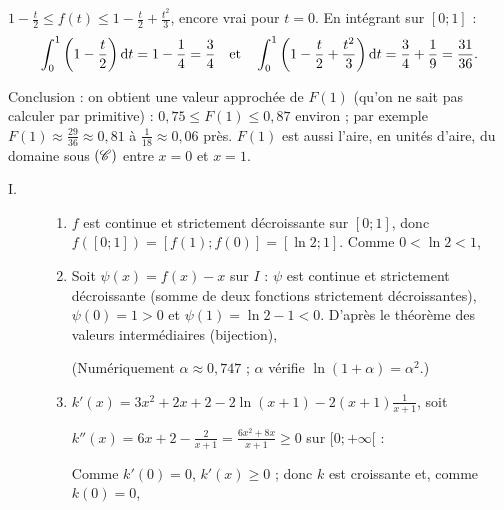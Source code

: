 \begin{description}
\begin{description}
\begin{enumerate}
				$1 - \frac{t}{2} \leq f(t) \leq 1 - \frac{t}{2} + \frac{t^2}{3}$, encore vrai pour $t = 0$.
				En intégrant sur $[0;1]$ :
				\[
					\int_0^1 \left(1 - \frac{t}{2}\right)\mathrm{d}t = 1 - \frac{1}{4} = \frac{3}{4}
					\quad\text{et}\quad
					\int_0^1 \left(1 - \frac{t}{2} + \frac{t^2}{3}\right)\mathrm{d}t = \frac{3}{4} + \frac{1}{9} = \frac{31}{36} .
				\]
				\par\noindent{}
				Conclusion : on obtient une valeur approchée de $F(1)$ (qu'on ne sait pas calculer par primitive) :
				$0{,}75 \leq F(1) \leq 0{,}87$ environ ; par exemple $F(1) \approx \frac{29}{36} \approx 0{,}81$ à $\frac{1}{18} \approx 0{,}06$ près.
				$F(1)$ est aussi l'aire, en unités d'aire, du domaine sous $(\mathscr{C})$ entre $x = 0$ et $x = 1$.
		\end{enumerate}
	\end{description}
	\item[Partie B :]
	\begin{description}
		\item[I. ]
		\begin{enumerate}
			\item {}
				$f$ est continue et strictement décroissante sur $[0;1]$, donc $f([0;1]) = [f(1) ; f(0)] = [\ln 2 ; 1]$.
				Comme $0 < \ln 2 < 1$, \par\noindent{}
			\item {}
				Soit $\psi(x) = f(x) - x$ sur $I$ : $\psi$ est continue et strictement décroissante (somme de deux fonctions strictement décroissantes),
				$\psi(0) = 1 > 0$ et $\psi(1) = \ln 2 - 1 < 0$. D'après le théorème des valeurs intermédiaires (bijection),
				\par\noindent{}
				(Numériquement $\alpha \approx 0{,}747$ ; $\alpha$ vérifie $\ln(1+\alpha) = \alpha^2$.)
			\item {}
				$k'(x) = 3x^2 + 2x + 2 - 2\ln(x+1) - 2(x+1)\frac{1}{x+1}$, soit \par\noindent{}
				$k''(x) = 6x + 2 - \frac{2}{x+1} = \frac{6x^2 + 8x}{x+1} \geq 0$ sur $[0;+\infty[$ : \par\noindent\ansbox{$k'$ est croissante sur $[0;+\infty[$.}
				Comme $k'(0) = 0$, $k'(x) \geq 0$ ; donc $k$ est croissante et, comme $k(0) = 0$,
				\par\noindent{}

\end{enumerate}
\end{description}
\end{description}
